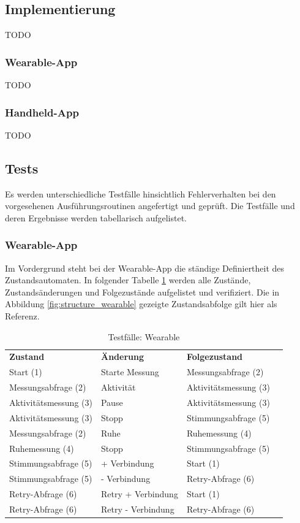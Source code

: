 \subsection{Implementierung}
TODO
\subsubsection{Wearable-App}
TODO
\subsubsection{Handheld-App}
TODO

\subsection{Tests}
Es werden unterschiedliche Testfälle hinsichtlich Fehlerverhalten bei den vorgesehenen Ausführungsroutinen angefertigt und geprüft. Die Testfälle und deren Ergebnisse werden tabellarisch aufgelistet.
\subsubsection{Wearable-App}
Im Vordergrund steht bei der Wearable-App die ständige Definiertheit des Zustandsautomaten. In folgender Tabelle \ref{tbl:testcases_wearable} werden alle Zustände, Zustandsänderungen und Folgezustände aufgelistet und verifiziert. Die in Abbildung \ref{fig:structure_wearable} gezeigte Zustandsabfolge gilt hier als Referenz.

\begin{table}[h]
	\centering
		\begin{tabularx}{\textwidth}{lXlc}
			\textbf{Zustand} 			& \textbf{Änderung} 	& \textbf{Folgezustand} 	&  \\
			Start (1) 						& Starte Messung 			& Messungsabfrage (2) 		& \ok \\
			Messungsabfrage (2) 	& Aktivität 					& Aktivitätsmessung (3) 	& \ok \\
			Aktivitätsmessung (3) & Pause 							& Aktivitätsmessung (3) 	& \ok \\
			Aktivitätsmessung (3) & Stopp 							& Stimmungsabfrage (5) 		& \ok \\
			Messungsabfrage (2) 	& Ruhe 								& Ruhemessung (4) 				& \ok \\
			Ruhemessung (4) 			& Stopp 							& Stimmungsabfrage (5) 		& \ok \\
			Stimmungsabfrage (5) 	& + Verbindung 				& Start (1) 							& \ok \\
			Stimmungsabfrage (5) 	& - Verbindung 				& Retry-Abfrage (6) 			& \ok \\
			Retry-Abfrage (6) 		& Retry + Verbindung 	& Start (1) 							& \ok \\
			Retry-Abfrage (6) 		& Retry - Verbindung 	& Retry-Abfrage (6) 			& \ok \\
		\end{tabularx}
		\caption{Testfälle: Wearable}
		\label{tbl:testcases_wearable}
\end{table}

